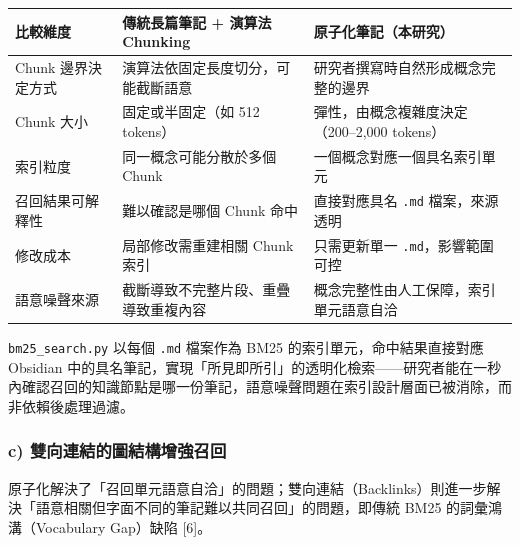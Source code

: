 {\def\LTcaptype{none} %
\begin{longtable}[]{@{}
  >{\raggedright\arraybackslash}p{}
  >{\raggedright\arraybackslash}p{}
  >{\raggedright\arraybackslash}p{}@{}}
\toprule\noalign{}
\begin{minipage}[b]{\linewidth}\raggedright
比較維度
\end{minipage} & \begin{minipage}[b]{\linewidth}\raggedright
傳統長篇筆記 + 演算法 Chunking
\end{minipage} & \begin{minipage}[b]{\linewidth}\raggedright
原子化筆記（本研究）
\end{minipage} \\
\midrule\noalign{}
\endhead
\bottomrule\noalign{}
\endlastfoot
Chunk 邊界決定方式 & 演算法依固定長度切分，可能截斷語意 &
研究者撰寫時自然形成概念完整的邊界 \\
Chunk 大小 & 固定或半固定（如 512 tokens） &
彈性，由概念複雜度決定（200--2,000 tokens） \\
索引粒度 & 同一概念可能分散於多個 Chunk &
一個概念對應一個具名索引單元 \\
召回結果可解釋性 & 難以確認是哪個 Chunk 命中 & 直接對應具名 \texttt{.md}
檔案，來源透明 \\
修改成本 & 局部修改需重建相關 Chunk 索引 & 只需更新單一
\texttt{.md}，影響範圍可控 \\
語意噪聲來源 & 截斷導致不完整片段、重疊導致重複內容 &
概念完整性由人工保障，索引單元語意自洽 \\
\end{longtable}
}

\texttt{bm25\_search.py} 以每個 \texttt{.md} 檔案作為 BM25
的索引單元，命中結果直接對應 Obsidian
中的具名筆記，實現「所見即所引」的透明化檢索------研究者能在一秒內確認召回的知識節點是哪一份筆記，語意噪聲問題在索引設計層面已被消除，而非依賴後處理過濾。

\subsubsection{c)
雙向連結的圖結構增強召回}\label{c-ux96d9ux5411ux9023ux7d50ux7684ux5716ux7d50ux69cbux589eux5f37ux53ecux56de}

原子化解決了「召回單元語意自洽」的問題；雙向連結（Backlinks）則進一步解決「語意相關但字面不同的筆記難以共同召回」的問題，即傳統
BM25 的詞彙鴻溝（Vocabulary Gap）缺陷 {[}6{]}。

